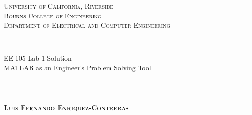 \documentclass[12pt, a4paper]{article}
\begin{document}
	\begin{titlepage}
		
		\newcommand{\HRule}{\rule{\linewidth}{0.5mm}} %
		
		\center %
		
		
		\textsc{\LARGE University of California, Riverside}\\[1.5cm] %
		\textsc{\Large Bourns College of Engineering}\\[0.5cm] %
		\textsc{\large Department of Electrical and Computer Engineering}\\[0.5cm] %
		
		
		\HRule \\[0.6cm]
		{\Large EE 105 Lab 1 Solution \\ \normalsize MATLAB as an Engineer’s Problem Solving Tool}\\[0.4cm] %
		\HRule \\[1.0cm]
		
		
		\begin{center} \large
			\medskip
			{\textsc{\textbf{Luis Fernando Enriquez-Contreras} }} 
		\end{center}
		
		
		\begin{center}
			{\large }
		\end{center}
		

\end{titlepage}
\end{document}
